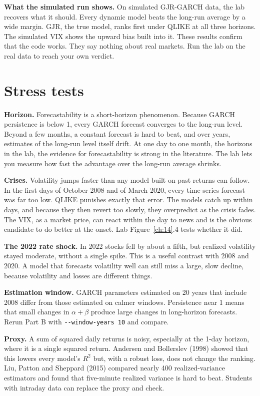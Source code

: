 \textbf{What the simulated run shows.} On simulated GJR-GARCH data, the lab recovers what it should. Every dynamic model beats the long-run average by a wide margin. GJR, the true model, ranks first under QLIKE at all three horizons. The simulated VIX shows the upward bias built into it. These results confirm that the code works. They say nothing about real markets. Run the lab on the real data to reach your own verdict.

\section{Stress tests}
\label{sec:14-stress}

\textbf{Horizon.} Forecastability is a short-horizon phenomenon. Because GARCH persistence is below 1, every GARCH forecast converges to the long-run level. Beyond a few months, a constant forecast is hard to beat, and over years, estimates of the long-run level itself drift. At one day to one month, the horizons in the lab, the evidence for forecastability is strong in the literature. The lab lets you measure how fast the advantage over the long-run average shrinks.

\textbf{Crises.} Volatility jumps faster than any model built on past returns can follow. In the first days of October 2008 and of March 2020, every time-series forecast was far too low. QLIKE punishes exactly that error. The models catch up within days, and because they then revert too slowly, they overpredict as the crisis fades. The VIX, as a market price, can react within the day to news and is the obvious candidate to do better at the onset. Lab Figure~\ref{ch:14}.4 tests whether it did.

\textbf{The 2022 rate shock.} In 2022 stocks fell by about a fifth, but realized volatility stayed moderate, without a single spike. This is a useful contrast with 2008 and 2020. A model that forecasts volatility well can still miss a large, slow decline, because volatility and losses are different things.

\textbf{Estimation window.} GARCH parameters estimated on 20 years that include 2008 differ from those estimated on calmer windows. Persistence near 1 means that small changes in $\alpha + \beta$ produce large changes in long-horizon forecasts. Rerun Part B with \texttt{-{}-window-years 10} and compare.

\textbf{Proxy.} A sum of squared daily returns is noisy, especially at the 1-day horizon, where it is a single squared return. Andersen and Bollerslev (1998) showed that this lowers every model's $R^2$ but, with a robust loss, does not change the ranking. Liu, Patton and Sheppard (2015) compared nearly 400 realized-variance estimators and found that five-minute realized variance is hard to beat. Students with intraday data can replace the proxy and check.

